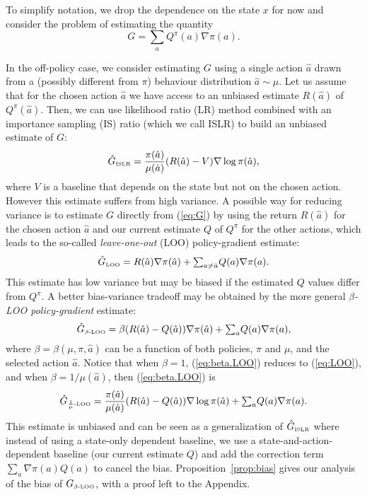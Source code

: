\documentclass{article}
\newcommand{\beq}{\begin{equation}}
\newcommand{\eeq}{\end{equation}}
\newcommand{\action}{{\hat a}}
\begin{document}
To simplify notation, we drop the dependence on the state $x$ for now and 
consider the problem of estimating the quantity
\beq\label{eq:G}
G = {\textstyle \sum_a } Q^{\pi}(a) \nabla \pi(a).
\eeq

In the off-policy case, we consider estimating $G$ using a single action $\action$ 
drawn from a (possibly different from $\pi$) behaviour distribution 
$\action\sim\mu$. Let us assume that for the chosen action $\action$ we have access to an 
unbiased estimate $R(\action)$ of $Q^{\pi}(\action)$. Then, we can use likelihood ratio (LR) 
method combined with an importance sampling (IS) ratio (which we call ISLR) to 
build an unbiased estimate of $G$:
$$ \hat G_{\mbox{\tiny ISLR}} = \frac{\pi(\action)}{\mu(\action)}(R(\action) - V) 
\nabla\log\pi(\action) ,$$
where $V$ is a baseline that depends on the state but not on the chosen action. 
However this estimate suffers from high variance. A possible way for reducing 
variance is to estimate $G$ directly from (\ref{eq:G}) by using the return 
$R(\action)$ for the chosen action $\action$ and our current estimate $Q$ of $Q^{\pi}$ for 
the other actions, which leads to the so-called {\em leave-one-out} (LOO) 
policy-gradient estimate:
\beq\label{eq:LOO}
\hat G_{\mbox{\tiny LOO}} = R(\action) \nabla \pi(\action) + {\textstyle \sum_{a\neq \action} } 
Q(a) \nabla 
\pi(a) .
\eeq
This estimate has low variance but may be biased if the estimated $Q$ values 
differ from $Q^{\pi}$. A better bias-variance tradeoff may be obtained by 
the more general {\em $\beta$-LOO policy-gradient} estimate:
\beq\label{eq:beta.LOO}
\hat G_{\mbox{\tiny $\beta$-LOO}} = \beta (R(\action) - Q(\action)) \nabla \pi(\action) + 
{\textstyle \sum_{a} }
 Q(a) \nabla \pi(a),
\eeq
where $\beta =  \beta(\mu,\pi,\action)$ can be a function of both policies, $\pi$ and 
$\mu$, and the selected action $\action$. Notice that when $\beta=1$, 
(\ref{eq:beta.LOO}) reduces to (\ref{eq:LOO}), and when $\beta=1/\mu(\action)$, then 
(\ref{eq:beta.LOO}) is
\beq \label{eq:1/mu.loo}
\hat G_{\mbox{\tiny $\frac{1}{\mu}$-LOO}} = 
\frac{\pi(\action)}{\mu(\action)} (R(\action) - Q(\action)) \nabla\log\pi(\action) + {\textstyle \sum_a } 
Q(a) 
\nabla\pi(a).
\eeq
This estimate is unbiased and can be seen as a generalization of $\hat 
G_{\mbox{\tiny ISLR}}$ where instead of using a state-only dependent baseline, 
we use a state-and-action-dependent baseline (our current estimate $Q$) and add 
the correction term $\sum_a\nabla\pi(a)Q(a)$ to cancel the bias. 
Proposition~\ref{prop:bias} gives our analysis of the bias of $G_{\mbox{\tiny 
$\beta$-LOO}}$, with a proof left to the Appendix.
\end{document}

